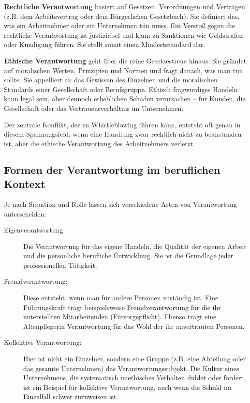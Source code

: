 \documentclass[
    12pt,               %
    a4paper,            %
    ngerman             %
]{scrartcl}
\begin{document}
\textbf{Rechtliche Verantwortung} basiert auf Gesetzen, Verordnungen und Verträgen (z.B. dem Arbeitsvertrag oder dem Bürgerlichen Gesetzbuch). Sie definiert das, was ein Arbeitnehmer oder ein Unternehmen tun muss. Ein Verstoß gegen die rechtliche Verantwortung ist justiziabel und kann zu Sanktionen wie Geldstrafen oder Kündigung führen. Sie stellt somit einen Mindeststandard dar.

\textbf{Ethische Verantwortung} geht über die reine Gesetzestreue hinaus. Sie gründet auf moralischen Werten, Prinzipien und Normen und fragt danach, was man tun sollte. Sie appelliert an das Gewissen des Einzelnen und die moralischen Standards einer Gesellschaft oder Berufsgruppe. Ethisch fragwürdiges Handeln kann legal sein, aber dennoch erheblichen Schaden verursachen – für Kunden, die Gesellschaft oder das Vertrauensverhältnis im Unternehmen.

Der zentrale Konflikt, der zu Whistleblowing führen kann, entsteht oft genau in diesem Spannungsfeld: wenn eine Handlung zwar rechtlich nicht zu beanstanden ist, aber die ethische Verantwortung des Arbeitnehmers verletzt.

\subsection{Formen der Verantwortung im beruflichen Kontext}
Je nach Situation und Rolle lassen sich verschiedene Arten von Verantwortung unterscheiden:

\begin{description}
    \item[Eigenverantwortung:] Die Verantwortung für das eigene Handeln, die Qualität der eigenen Arbeit und die persönliche berufliche Entwicklung. Sie ist die Grundlage jeder professionellen Tätigkeit.
    \item[Fremdverantwortung:] Diese entsteht, wenn man für andere Personen zuständig ist. Eine Führungskraft trägt beispielsweise Fremdverantwortung für die ihr unterstellten Mitarbeitenden (Fürsorgepflicht). Ebenso trägt eine Altenpflegerin Verantwortung für das Wohl der ihr anvertrauten Personen.
    \item[Kollektive Verantwortung:] Hier ist nicht ein Einzelner, sondern eine Gruppe (z.B. eine Abteilung oder das gesamte Unternehmen) das Verantwortungssubjekt. Die Kultur eines Unternehmens, die systematisch unethisches Verhalten duldet oder fördert, ist ein Beispiel für kollektive Verantwortung, auch wenn die Schuld im Einzelfall schwer zuzuweisen ist.
\end{description}
\end{document}
